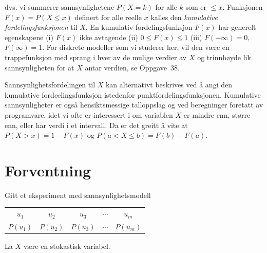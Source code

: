 \noindent dvs. vi summerer sannsynlighetene $P(X=k)$ for alle $k$ som er
$\leq x$. Funksjonen $F(x)=P(X \leq x)$ definert for alle reelle
$x$ kalles den {\em kumulative fordelingsfunksjonen} til $X$.
En kumulativ fordelingsfunksjon $F(x)$ har generelt egenskapene
(i) $F(x)$ ikke avtagende (ii) $0\leq F(x)\leq 1$ 
(iii) $F(-\infty)=0,$ \ $F(\infty)=1$.
For diskrete modeller som vi studerer her, vil den
være en trappefunksjon med sprang i hver av de mulige verdier av
$X$ og trinnhøyde lik sannsynligheten for at $X$ antar verdien,
se Oppgave~38.

Sannsynlighetsfordelingen til $X$ kan alternativt beskrives ved å
angi den kumulative fordeelingsfunksjon istedenfor punktfordelingsfunksjonen.
Kumulative sannsynligheter er også hensiktsmessige talloppslag og ved
beregninger foretatt av programvare, idet vi ofte er interessert i om 
variablen $X$ er mindre enn, større enn, eller har verdi i et intervall.
Da er det greitt å vite at $P(X>x)=1-F(x)$ og $P(a<X\leq b)=F(b)-F(a)$.


\section{Forventning}

Gitt et eksperiment med sannsynlighetsmodell
\begin{center}
  \begin{tabular}{ccccc} 
     $u_1$ &   $u_2$  &   $u_3$  & $\cdots$ &  $u_m$ \\
  $P(u_1)$ & $P(u_2)$ & $P(u_3)$ & $\cdots$ & $P(u_m)$
  \end{tabular}
\end{center}
La $X$ være en stokastisk variabel.
\begin{center}  \end{center}


